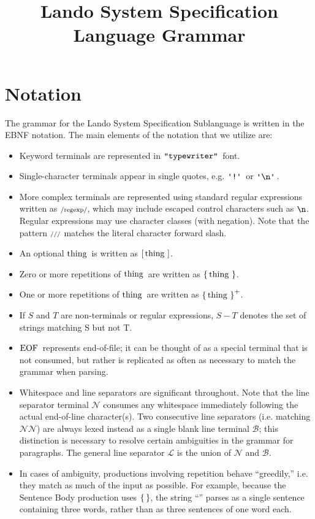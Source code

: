 \documentclass{article}
\newcommand{\gnn}{\ensuremath{\mathcal{N}}}
\newcommand{\gnl}{\ensuremath{\mathcal{L}}}
\newcommand{\gnb}{\ensuremath{\mathcal{B}}}
\begin{document}
\title{Lando System Specification Language Grammar}
\maketitle

\section{Notation}

The grammar for the Lando System Specification Sublanguage is written in the EBNF notation. The main elements of the notation that we utilize are:
\begin{itemize}
  \item Keyword terminals are represented in $\mathop{\texttt{"typewriter"}}\,$ font. 
  \item Single-character terminals appear in single quotes, e.g. $\gtkc{!}$ or $\gtkc{\gtesc{n}}$.
  \item More complex terminals are represented using standard regular expressions written as $\textrm{\scriptsize /regexp/}$, which may include escaped control characters such as $\texttt{\textbackslash {n}}$. Regular expressions may use character classes (with negation). Note that the pattern $\textrm{\scriptsize ///}$ matches the literal character forward slash.
  \item An optional $\mathop{\textrm{thing}}\,$ is written as $\mathop{\operatorname{[} \mathop{\mathop{\textrm{thing}}\,} \operatorname{]}}$.
  \item {Zero or more repetitions of $\mathop{\textrm{thing}}\,$ are written as $\mathop{\operatorname{\{} \mathop{\textrm{thing}}\, \operatorname{\}}}$}.
  \item One or more repetitions of $\mathop{\textrm{thing}}\,$ are written as $\mathop{\operatorname{\{} \mathop{\textrm{thing}}\, \operatorname{\}}^+}$.
  \item If $S$ and $T$ are non-terminals or regular expressions, $S - T$ denotes the set of strings matching S but not T.
  \item $\mathop{\textrm{EOF}}\,$ represents end-of-file; it can be thought of as a special terminal that is not consumed, but rather is replicated as often as necessary to match the grammar when parsing.
  \item Whitespace and line separators are significant throughout. Note that the line separator terminal $\gnn$ consumes any whitespace immediately following the actual end-of-line character(s). Two consecutive line separators (i.e. matching $\gnn\gnn$) are always lexed instead as a single blank line terminal $\gnb$;
    this distinction is necessary to resolve certain ambiguities in the grammar for paragraphs.
    The general line separator $\gnl$ is the union of $\gnn$ and $\gnb$.
  \item In cases of ambiguity, productions involving repetition behave ``greedily,'' i.e. they match as much of the input as possible.
    For example, because the Sentence Body production uses $\mathop{\operatorname{\{}  \operatorname{\}}}$,  the string ``'' parses as a single sentence
    containing three words, rather than as three sentences of one word each.
\end{itemize}
\end{document}
